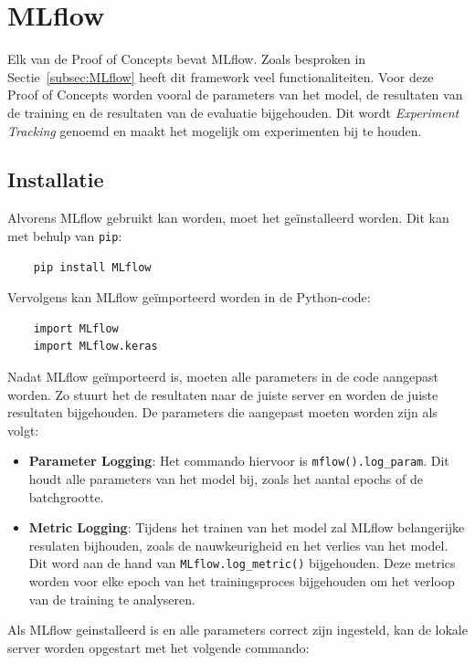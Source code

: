 
\section{MLflow}

Elk van de Proof of Concepts bevat MLflow. Zoals besproken in Sectie~\ref{subsec:MLflow} heeft dit framework veel functionaliteiten. Voor deze Proof of Concepts worden vooral de parameters van het model, de resultaten van de training en de resultaten van de evaluatie bijgehouden. Dit wordt \textit{Experiment Tracking} genoemd en maakt het mogelijk om experimenten bij te houden.

\subsection{Installatie}

Alvorens MLflow gebruikt kan worden, moet het geïnstalleerd worden. Dit kan met behulp van \texttt{pip}:

\begin{verbatim}
    pip install MLflow
\end{verbatim}

Vervolgens kan MLflow geïmporteerd worden in de Python-code:

\begin{verbatim}
    import MLflow
    import MLflow.keras
\end{verbatim}

Nadat MLflow geïmporteerd is, moeten alle parameters in de code aangepast worden. Zo stuurt het de resultaten naar de juiste server en worden de juiste resultaten bijgehouden. De parameters die aangepast moeten worden zijn als volgt:

\begin{itemize}
    \item \textbf{Parameter Logging}: Het commando hiervoor is \texttt{mflow().log\_param}. Dit houdt alle parameters van het model bij, zoals het aantal epochs of de batchgrootte.
    \item \textbf{Metric Logging}: Tijdens het trainen van het model zal MLflow belangerijke resulaten bijhouden, zoals de nauwkeurigheid en het verlies van het model. Dit word aan de hand van \texttt{MLflow.log\_metric()} bijgehouden. Deze metrics worden voor elke epoch van het trainingsproces bijgehouden om het verloop van de training te analyseren.
\end{itemize}

Als MLflow geinstalleerd is en alle parameters correct zijn ingesteld, kan de lokale server worden opgestart met het volgende commando:

